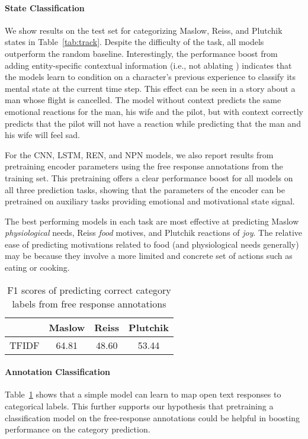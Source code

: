 \documentclass[11pt,a4paper]{article}
\begin{document}
\paragraph{State Classification} We show results on the test set for categorizing Maslow, Reiss, and Plutchik states in Table~\ref{tab:track}.  Despite the difficulty of the task, all models outperform the random baseline. Interestingly, the performance boost from adding entity-specific contextual information (i.e., not ablating ) indicates that the models learn to condition on a character's previous experience to classify its mental state at the current time step.  This effect can be seen in a story about a man whose flight is cancelled. The model without context predicts the same emotional reactions for the man, his wife and the pilot, but with context correctly predicts that the pilot will not have a reaction while predicting that the man and his wife will feel sad.



For the CNN, LSTM, REN, and NPN models, we also report results from pretraining encoder parameters using the free response annotations from the training set.  This pretraining offers a clear performance boost for all models on all three prediction tasks, showing that the parameters of the encoder can be pretrained on auxiliary tasks providing emotional and motivational state signal.

The best performing models in each task are most effective at predicting Maslow \textit{physiological} needs, Reiss \textit{food} motives, and Plutchik reactions of \textit{joy}. The relative ease of predicting motivations related to food (and physiological needs generally) may be because they involve a more limited and concrete set of actions such as eating or cooking.

\begin{table}[tb]
\centering
\begin{tabular}{l  c  c c}
\toprule
 & Maslow & Reiss & Plutchik \\
\midrule
TFIDF        &   64.81    &  48.60 &    53.44  \\   
\bottomrule
\end{tabular}
\caption{F1 scores of predicting correct category labels from free response annotations}
\label{tab:map}
\end{table}
\vspace{-1mm}
\paragraph{Annotation Classification}  Table~\ref{tab:map} shows that a simple model can learn to map open text responses to categorical labels. This further supports our hypothesis that pretraining a classification model on the free-response annotations could be helpful in boosting performance on the category prediction. 
\vspace{-1mm}
\end{document}
